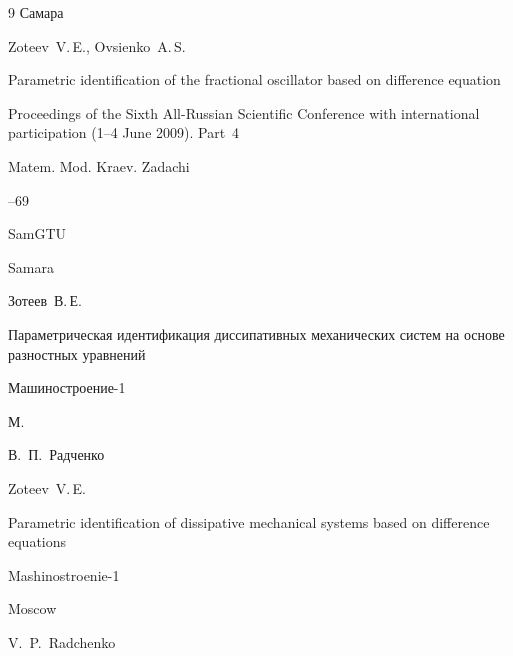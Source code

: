 \begin{thebibliography}{9}
\publaddr Самара

\misctransl

\by Zoteev~V.\,E., Ovsienko~A.\,S.

\paper Parametric identification of the fractional oscillator based on difference equation

\inbook Proceedings of the Sixth All-Russian Scientific Conference with international participation \rm (1--4 June 2009). Part~4

\serial Matem. Mod. Kraev. Zadachi


--69

\publ SamGTU

\publaddr Samara








\by Зотеев~В.\,Е.

\book Параметрическая идентификация диссипативных механических систем на основе разностных уравнений


\publ Машиностроение-1

\publaddr М.

\ed В.~П.~Радченко


\misctransl

\by Zoteev~V.\,E.

\book Parametric identification of dissipative mechanical systems based on difference equations


\publ Mashinostroenie-1

\publaddr Moscow

\ed V.~P.~Radchenko




\end{thebibliography}





\noindent

\hskip6.5cm \thedate \par\noindent

\hskip6.5cm\therevdate






%




\makeengtitlem





\newpage



%

